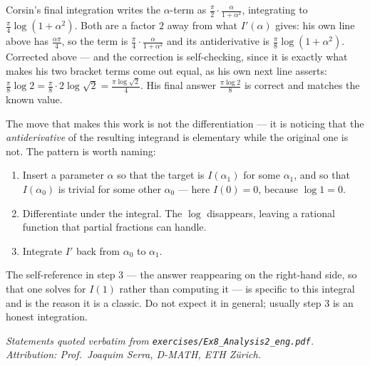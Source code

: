 \begin{ainote}
Corsin's final integration writes the $\alpha$-term as
$\tfrac{\pi}{2}\cdot\tfrac{\alpha}{1+\alpha^2}$, integrating to $\tfrac{\pi}{4}\log(1+\alpha^2)$.
Both are a factor $2$ away from what $I'(\alpha)$ gives: his own line above has
$\tfrac{\alpha\pi}{4}$, so the term is $\tfrac{\pi}{4}\cdot\tfrac{\alpha}{1+\alpha^2}$ and its
antiderivative is $\tfrac{\pi}{8}\log(1+\alpha^2)$. Corrected above --- and the correction is
self-checking, since it is exactly what makes his two bracket terms come out equal, as his own
next line asserts:
$\tfrac{\pi}{8}\log 2 = \tfrac{\pi}{8}\cdot 2\log\sqrt2 = \tfrac{\pi\log\sqrt2}{4}$. His final
answer $\tfrac{\pi\log 2}{8}$ is correct and matches the known value.
\end{ainote}

\begin{ainote}
The move that makes this work is not the differentiation --- it is noticing that the
\emph{antiderivative} of the resulting integrand is elementary while the original one is not.
The pattern is worth naming:
\begin{enumerate}[label=\textbf{\arabic*.}]
  \item Insert a parameter $\alpha$ so that the target is $I(\alpha_1)$ for some
    $\alpha_1$, and so that $I(\alpha_0)$ is trivial for some other $\alpha_0$ --- here
    $I(0)=0$, because $\log 1 = 0$.
  \item Differentiate under the integral. The $\log$ disappears, leaving a rational function
    that partial fractions can handle.
  \item Integrate $I'$ back from $\alpha_0$ to $\alpha_1$.
\end{enumerate}
The self-reference in step 3 --- the answer reappearing on the right-hand side, so that one
solves for $I(1)$ rather than computing it --- is specific to this integral and is the reason it
is a classic. Do not expect it in general; usually step 3 is an honest integration.
\end{ainote}


\textit{Statements quoted verbatim from \texttt{exercises/Ex8\_Analysis2\_eng.pdf}.
Attribution: Prof.\ Joaquim Serra, D-MATH, ETH Z\"urich.}

